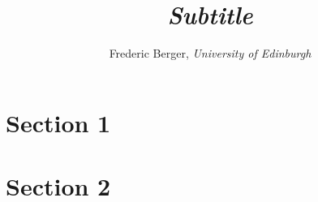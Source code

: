 \documentclass[10pt,twocolumn,twoside]{Policy-brief}
\title{\textit{Subtitle}}
\author{Frederic Berger, \textit{University of Edinburgh}}
\begin{document}
\maketitle

\section*{Section 1}



\section*{Section 2}





\newpage


%
\end{document}
